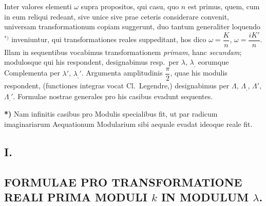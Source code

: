 \documentclass{article}
\begin{document}
Inter valores elementi $\omega$ supra propositos, qui casu, quo $n$ est primus, quem, cum in eum reliqui redeant, sive unice sive prae ceteris considerare convenit, universam transformationum copiam suggerunt, duo tantum generaliter loquendo ${}^{*)}$ inveniuntur, qui transformationes reales suppeditant, hos dico $\omega=\dfrac{K}{n}$, $\omega=\dfrac{iK'}{n}$. Illam in sequentibus vocabimus transformationem \emph{primam}, hanc \emph{secundam}; modulosque qui his respondent, designabimus resp.\ per $\lambda$, $\lambda_{,}$ eorumque Complementa per $\lambda'$, $\lambda_{,}'$. Argumenta amplitudinis $\dfrac{\pi}{2}$, quae his modulis respondent, (functiones integras vocat Cl.\ Legendre,) designabimus per $\Lambda$, $\Lambda_{,}$, $\Lambda'$, $\Lambda_{,}'$. Formulae nostrae generales pro his casibus evadunt sequentes.

\textbf{*)} Nam infinitis casibus pro Modulis specialibus fit, ut par radicum imaginariarum Aequationum Modularium sibi aequale evadat ideoque reale fit.

\subsection*{I.}

\subsection*{FORMULAE PRO TRANSFORMATIONE REALI PRIMA MODULI $k$ IN MODULUM $\lambda$.}
\end{document}
